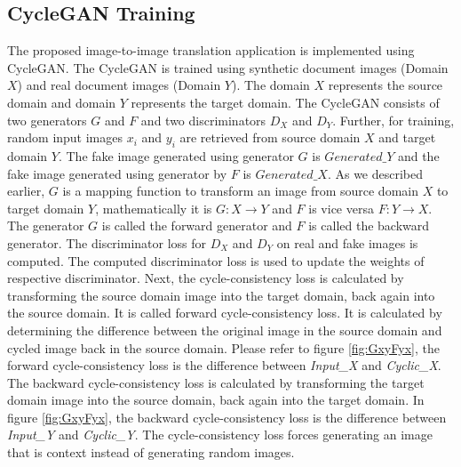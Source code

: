 \subsection{\ac{CycleGAN} Training}




The proposed image-to-image translation application is implemented using \ac{CycleGAN}. The \ac{CycleGAN} is trained using synthetic document images (Domain $X$) and real document images (Domain $Y$). The domain $X$ represents the source domain and domain $Y$ represents the target domain. The \ac{CycleGAN} consists of two generators $G$ and $F$ and two discriminators $D_X$ and $D_Y$. Further, for training, random input images $x_i$ and $y_i$ are retrieved from source domain $X$ and target domain $Y$. The fake image generated using generator $G$ is $Generated\_Y$ and the fake image generated using generator by $F$ is $Generated\_X$. As we described earlier, $G$ is a mapping function to transform an image from source domain $X$ to target domain $Y$, mathematically it is $G: X \rightarrow Y$ and $F$ is vice versa $F: Y \rightarrow X$. The generator $G$ is called the forward generator and $F$ is called the backward generator. The discriminator loss for $D_X$ and $D_Y$ on real and fake images is computed. The computed discriminator loss is used to update the weights of respective discriminator. Next, the cycle-consistency loss is calculated by transforming the source domain image into the target domain, back again into the source domain. It is called forward cycle-consistency loss. It is calculated by determining the difference between the original image in the source domain and cycled image back in the source domain. Please refer to figure \ref{fig:GxyFyx}, the forward cycle-consistency loss is the difference between \textit{Input\_X} and \textit{Cyclic\_X}. The backward cycle-consistency loss is calculated by transforming the target domain image into the source domain, back again into the target domain. In figure \ref{fig:GxyFyx}, the backward cycle-consistency loss is the difference between \textit{Input\_Y} and \textit{Cyclic\_Y}. The cycle-consistency loss forces generating an image that is context instead of generating random images.


